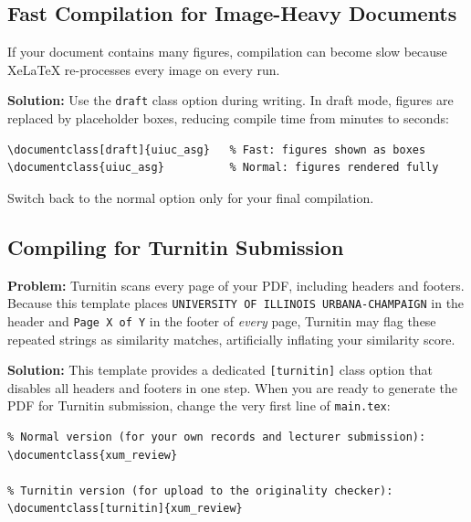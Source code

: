 \subsection{Fast Compilation for Image-Heavy Documents}

If your document contains many figures, compilation can become slow because
XeLaTeX re-processes every image on every run.

\textbf{Solution:} Use the \texttt{draft} class option during writing.
In draft mode, figures are replaced by placeholder boxes, reducing compile
time from minutes to seconds:

\begin{verbatim}
\documentclass[draft]{uiuc_asg}   % Fast: figures shown as boxes
\documentclass{uiuc_asg}          % Normal: figures rendered fully
\end{verbatim}

Switch back to the normal option only for your final compilation.

\subsection{Compiling for Turnitin Submission}

\textbf{Problem:} Turnitin scans every page of your PDF, including headers
and footers. Because this template places \texttt{UNIVERSITY OF ILLINOIS URBANA-CHAMPAIGN}
in the header and \texttt{Page X of Y} in the footer of \emph{every} page,
Turnitin may flag these repeated strings as similarity matches, artificially
inflating your similarity score.

\textbf{Solution:} This template provides a dedicated \texttt{[turnitin]}
class option that disables all headers and footers in one step.
When you are ready to generate the PDF for Turnitin submission, change the
very first line of \texttt{main.tex}:

\begin{verbatim}
% Normal version (for your own records and lecturer submission):
\documentclass{xum_review}

% Turnitin version (for upload to the originality checker):
\documentclass[turnitin]{xum_review}
\end{verbatim}

